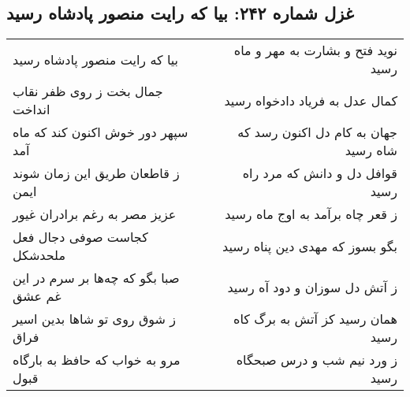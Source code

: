 \begin{center}
\section*{غزل شماره ۲۴۲: بیا که رایت منصور پادشاه رسید}
\label{sec:sh242}
\begin{longtable}{l p{0.5cm} r}
بیا که رایت منصور پادشاه رسید
&&
نوید فتح و بشارت به مهر و ماه رسید
\\
جمال بخت ز روی ظفر نقاب انداخت
&&
کمال عدل به فریاد دادخواه رسید
\\
سپهر دور خوش اکنون کند که ماه آمد
&&
جهان به کام دل اکنون رسد که شاه رسید
\\
ز قاطعان طریق این زمان شوند ایمن
&&
قوافل دل و دانش که مرد راه رسید
\\
عزیز مصر به رغم برادران غیور
&&
ز قعر چاه برآمد به اوج ماه رسید
\\
کجاست صوفی دجال فعل ملحدشکل
&&
بگو بسوز که مهدی دین پناه رسید
\\
صبا بگو که چه‌ها بر سرم در این غم عشق
&&
ز آتش دل سوزان و دود آه رسید
\\
ز شوق روی تو شاها بدین اسیر فراق
&&
همان رسید کز آتش به برگ کاه رسید
\\
مرو به خواب که حافظ به بارگاه قبول
&&
ز ورد نیم شب و درس صبحگاه رسید
\\
\end{longtable}
\end{center}
